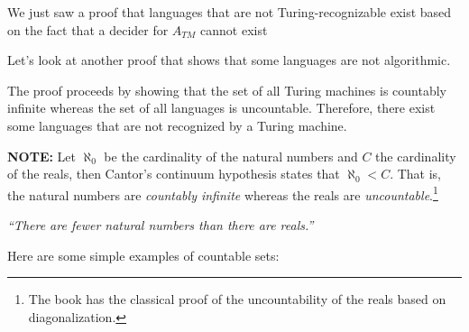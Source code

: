 \documentclass[a4paper,blends,pdf,colorBG,slideColor]{prosper}
\begin{document}

We just saw a  proof that languages that are not Turing-recognizable exist based on
the fact that a decider for $A_{TM}$ cannot exist

Let's look at another proof that shows that some languages are not algorithmic.

The proof proceeds by showing that the set of all Turing machines is countably infinite whereas the set of all languages is uncountable.  Therefore, there exist some languages
that are not recognized by a Turing machine.

{\bf NOTE:} Let $\aleph_0$ be the cardinality of the natural numbers and $C$ the cardinality of the reals, then Cantor's continuum hypothesis states that $\aleph_0 < C$.
That is, the natural numbers are {\em countably infinite} whereas the reals are {\em uncountable}.\footnote{The book has the classical proof of the uncountability of the reals based on diagonalization.}

\begin{center}
\em ``There are fewer natural numbers than there are reals.''
\end{center}
\vspace{.5in}
\es


Here are some simple examples of countable sets:
\end{document}
